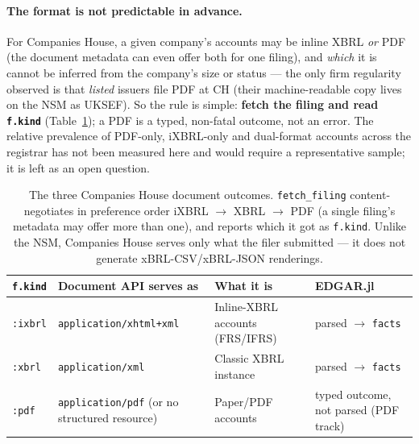 \documentclass[11pt,a4paper]{report}
\begin{document}
\paragraph{The format is not predictable in advance.} For Companies House, a given company's accounts
may be inline XBRL \emph{or} PDF (the document metadata can even offer both for one filing), and
\emph{which} it is cannot be inferred from the company's size or status --- the only firm
regularity observed is that \emph{listed} issuers file PDF at CH (their machine-readable copy lives on
the NSM as UKSEF). So the rule is simple: \textbf{fetch the filing and read \texttt{f.kind}}
(Table~\ref{tab:ch-formats}); a PDF is a typed, non-fatal outcome, not an error.
The relative prevalence of PDF-only, iXBRL-only and dual-format accounts across the registrar has not
been measured here and would require a representative sample; it is left as an open question.

\begin{table}[h]
\centering
\caption{The three Companies House document outcomes. \texttt{fetch\_filing} content-negotiates in
preference order iXBRL \(\rightarrow\) XBRL \(\rightarrow\) PDF (a single filing's metadata may offer
more than one), and reports which it got as \texttt{f.kind}. Unlike the NSM, Companies House serves only
what the filer submitted --- it does not generate xBRL-CSV/xBRL-JSON renderings.}
\label{tab:ch-formats}
\small
\begin{tabular}{@{}p{}p{}p{}p{}@{}}
\toprule
\textbf{\texttt{f.kind}} & \textbf{Document API serves as} & \textbf{What it is} & \textbf{EDGAR.jl} \\
\midrule
\texttt{:ixbrl} & \texttt{application/xhtml+xml} & Inline-XBRL accounts (FRS/IFRS) & parsed $\to$ \texttt{facts} \\
\texttt{:xbrl}  & \texttt{application/xml}       & Classic XBRL instance            & parsed $\to$ \texttt{facts} \\
\texttt{:pdf}   & \texttt{application/pdf} (or no structured resource) & Paper/PDF accounts & typed outcome, not parsed (PDF track) \\
\bottomrule
\end{tabular}
\end{table}
\end{document}
